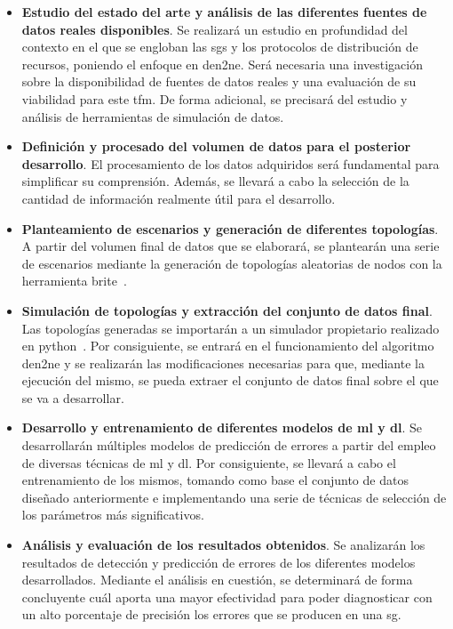 \begin{itemize}
    \item \textbf{Estudio del estado del arte y análisis de las diferentes fuentes de datos reales disponibles}. Se realizará un estudio en profundidad del contexto en el que se engloban las \gls{sg}s y los protocolos de distribución de recursos, poniendo el enfoque en \gls{den2ne}. Será necesaria una investigación sobre la disponibilidad de fuentes de datos reales y una evaluación de su viabilidad para este \gls{tfm}. De forma adicional, se precisará del estudio y análisis de herramientas de simulación de datos.
    \pagebreak
    \item \textbf{Definición y procesado del volumen de datos para el posterior desarrollo}. El procesamiento de los datos adquiridos será fundamental para simplificar su comprensión. Además, se llevará a cabo la selección de la cantidad de información realmente útil para el desarrollo.    

    \item \textbf{Planteamiento de escenarios y generación de diferentes topologías}. A partir del volumen final de datos que se elaborará, se plantearán una serie de escenarios mediante la generación de topologías aleatorias de nodos con la herramienta \gls{brite}~\cite{brite}.
    
    \item \textbf{Simulación de topologías y extracción del conjunto de datos final}. Las topologías generadas se importarán a un simulador propietario realizado en python~\cite{gitbrite}. Por consiguiente, se entrará en el funcionamiento del algoritmo \gls{den2ne} y se realizarán las modificaciones necesarias para que, mediante la ejecución del mismo, se pueda extraer el conjunto de datos final sobre el que se va a desarrollar.
    
    \item \textbf{Desarrollo y entrenamiento de diferentes modelos de \gls{ml} y \gls{dl}}. Se desarrollarán múltiples modelos de predicción de errores a partir del empleo de diversas técnicas de \gls{ml} y \gls{dl}. Por consiguiente, se llevará a cabo el entrenamiento de los mismos, tomando como base el conjunto de datos diseñado anteriormente e implementando una serie de técnicas de selección de los parámetros más significativos.
    
    \item \textbf{Análisis y evaluación de los resultados obtenidos}. Se analizarán los resultados de detección y predicción de errores de los diferentes modelos desarrollados. Mediante el análisis en cuestión, se determinará de forma concluyente cuál aporta una mayor efectividad para poder diagnosticar con un alto porcentaje de precisión los errores que se producen en una \gls{sg}.
    
\end{itemize}


